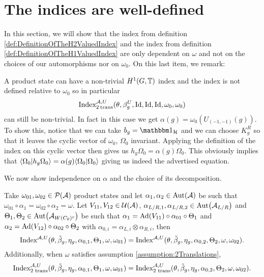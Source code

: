 \documentclass[11pt,a4paper,twoside]{article}
\numberwithin{equation}{section}
\begin{document}
	\section{The indices are well-defined}\label{sec:IndexIsInvariantUnderChoices}
	In this section, we will show that the index from definition \ref{def:DefinitionOfTheH2ValuedIndex} and the index from definition \ref{def:DefinitionOfTheH1ValuedIndex} are only dependent on $\omega$ and not on the choices of our automorphisms nor on $\omega_0$. On this last item, we remark:
	\begin{remark}\label{rem:NontrivialProductState}
		A product state can have a non-trivial $H^1(G,\TT)$ index and the index is not defined relative to $\omega_0$ so in particular
		\begin{equation}
			\textrm{Index}_{2\:\text{trans}}^{\AA,U}(\theta,\beta_g^U,\textrm{Id},\textrm{Id},\textrm{Id},\omega_0,\omega_0)
		\end{equation}
		can still be non-trivial. In fact in this case we get $\alpha(g)=\omega_0(U_{(-1,-1)}(g))$. To show this, notice that we can take $b_g=\id_{\HH}$ and we can choose $K_g^R$ so that it leaves the cyclic vector of $\omega_0$, $\Omega_0$ invariant. Applying the definition of the index on this cyclic vector then gives us $h_g\Omega_0=\alpha(g)\Omega_0$. This obviously implies that $\bra{\Omega_0}\ket{h_g\Omega_0}=\alpha(g)\bra{\Omega_0}\ket{\Omega_0}$ giving us indeed the advertised equation.
	\end{remark}
	We now show independence on $\alpha$ and the choice of its decomposition.
	\begin{lemma}
		Take $\omega_{01},\omega_{02}\in\PP(\AA)$ product states and let $\alpha_1,\alpha_2\in\Aut{\AA}$ be such that $\omega_{01}\circ\alpha_1=\omega_{02}\circ\alpha_2=\omega$. Let $V_{11},V_{12}\in\UU(\AA)$, $\alpha_{L/R,1},\alpha_{L/R,2}\in\Aut{\AA_{L/R}}$ and $\Theta_1,\Theta_2\in \Aut{\AA_{W(C_\theta)^c}}$ be such that $\alpha_1=\Ad{V_{11}}\circ\alpha_{01}\circ\Theta_1$ and $\alpha_2=\Ad{V_{12}}\circ\alpha_{02}\circ \Theta_2$ with $\alpha_{0,i}=\alpha_{L,i}\otimes\alpha_{R,i}$, then
		\begin{equation}
			\textrm{Index}^{\AA,U}(\theta,\tilde{\beta}_g,\eta_g,\alpha_{0,1},\Theta_1,\omega,\omega_{01})=\textrm{Index}^{\AA,U}(\theta,\tilde{\beta}_g,\eta_g,\alpha_{0,2},\Theta_2,\omega,\omega_{02}).
		\end{equation}
		Additionally, when $\omega$ satisfies assumption \ref{assumption:2Translations},
		\begin{equation}
			\textrm{Index}^{\AA,U}_{\text{2 trans}}(\theta,\tilde{\beta}_g,\eta_g,\alpha_{0,1},\Theta_1,\omega,\omega_{01})=\textrm{Index}^{\AA,U}_{\text{2 trans}}(\theta,\tilde{\beta}_g,\eta_g,\alpha_{0,2},\Theta_2,\omega,\omega_{02}).
		\end{equation}
	\end{lemma}
\end{document}
